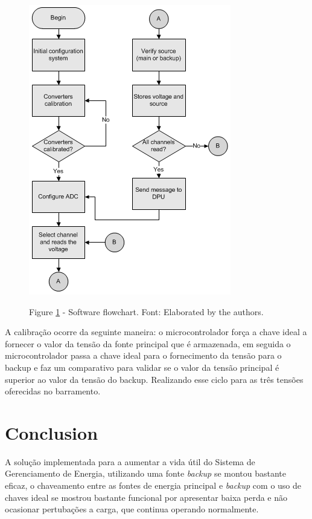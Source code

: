 \documentclass[final,3p,times,twocolumn,authoryear]{elsarticle}
\begin{document}
	\begin{figure}[th]
		\label{flow}
		\centering
		\includegraphics[width=0.8\linewidth]{./figs/fluxo}
			
		\begin{small}
		Figure \ref{flow} - Software flowchart. Font: Elaborated by the authors.
		\end{small}		
	\end{figure}

	A calibração ocorre da seguinte maneira: o microcontrolador força a chave ideal a fornecer o valor da tensão da fonte principal que é armazenada, em seguida o microcontrolador passa a chave ideal para o fornecimento da tensão para o backup e faz um comparativo para validar se o valor da tensão principal é superior ao valor da tensão do backup. Realizando esse ciclo para as três tensões oferecidas no barramento.

\section{Conclusion}
\label{Conclusion}

	 A solução implementada para a aumentar a vida útil do Sistema de Gerenciamento de Energia, utilizando uma fonte \textit{backup} se montou bastante eficaz, o chaveamento entre as fontes de energia principal e \textit{backup} com o uso de chaves ideal se mostrou bastante funcional por apresentar baixa perda e não ocasionar pertubações a carga, que continua operando normalmente. 
	
\end{document}
